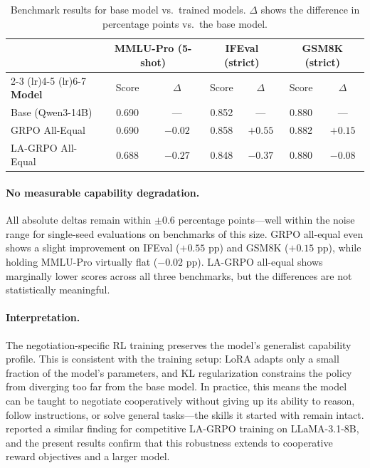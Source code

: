 \documentclass[12pt,a4paper]{article}
\renewcommand{\arraystretch}{1.25}
\begin{document}
\begin{table}[H]
\centering
\caption[Benchmark results for base model vs.\ trained models.]{Benchmark results for base model vs.\ trained models. $\Delta$ shows the difference in percentage points vs.\ the base model.}
\label{tab:benchmarks}
\renewcommand{\arraystretch}{1.15}
\begin{tabular}{lcccccc}
\toprule
& \multicolumn{2}{c}{\textbf{MMLU-Pro (5-shot)}} & \multicolumn{2}{c}{\textbf{IFEval (strict)}} & \multicolumn{2}{c}{\textbf{GSM8K (strict)}} \\
\cmidrule(lr){2-3} \cmidrule(lr){4-5} \cmidrule(lr){6-7}
\textbf{Model} & Score & $\Delta$ & Score & $\Delta$ & Score & $\Delta$ \\
\midrule
Base (Qwen3-14B) & 0.690 & --- & 0.852 & --- & 0.880 & --- \\
GRPO All-Equal & 0.690 & $-0.02$ & 0.858 & $+0.55$ & 0.882 & $+0.15$ \\
LA-GRPO All-Equal & 0.688 & $-0.27$ & 0.848 & $-0.37$ & 0.880 & $-0.08$ \\
\bottomrule
\end{tabular}
\end{table}

\paragraph{No measurable capability degradation.} All absolute deltas remain within $\pm 0.6$ percentage points---well within the noise range for single-seed evaluations on benchmarks of this size. GRPO all-equal even shows a slight improvement on IFEval ($+0.55$ pp) and GSM8K ($+0.15$ pp), while holding MMLU-Pro virtually flat ($-0.02$ pp). LA-GRPO all-equal shows marginally lower scores across all three benchmarks, but the differences are not statistically meaningful.

\paragraph{Interpretation.} The negotiation-specific RL training preserves the model's generalist capability profile. This is consistent with the training setup: LoRA adapts only a small fraction of the model's parameters, and KL regularization constrains the policy from diverging too far from the base model. In practice, this means the model can be taught to negotiate cooperatively without giving up its ability to reason, follow instructions, or solve general tasks---the skills it started with remain intact. \citet{franceschetti2025advantage} reported a similar finding for competitive LA-GRPO training on LLaMA-3.1-8B, and the present results confirm that this robustness extends to cooperative reward objectives and a larger model.
\end{document}
